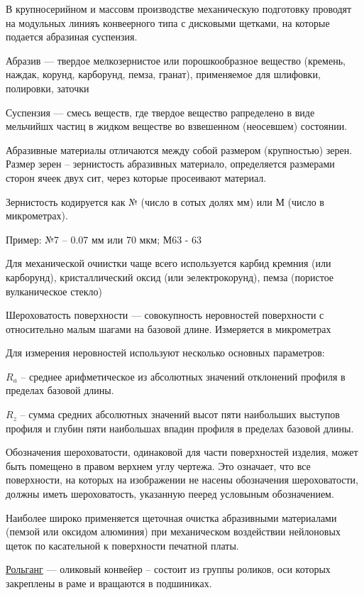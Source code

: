 \documentclass{article}
\begin{document}
В крупносерийном и массовм производстве механическую подготовку проводят на модульных линияъ конвеерного типа с дисковыми щетками, на которые подается абразиная суспензия.

Абразив --- твердое мелкозернистое или порошкообразное вещество (кремень, наждак, корунд, карборунд, пемза, гранат), применяемое для шлифовки, полировки, заточки

Суспензия --- смесь веществ, где твердое вещество рапределено в виде мельчийшх частиц в жидком веществе во взвешенном (неосевшем) состоянии.

Абразивные материалы отличаются между собой размером (крупностью) зерен. Размер зерен -- зернистость абразивных материало, определяется размерами сторон ячеек двух сит, через которые просеивают материал.

Зернистость кодируется как № (число в сотых долях мм) или М (число в микрометрах).

Пример: №7 -- 0.07 мм или 70 мкм; М63 - 63

Для механической очиистки чаще всего используется карбид кремния (или карборунд), кристаллический оксид (или эелектрокорунд), пемза (пористое вулканическое стекло)

Шероховатость поверхности --- совокупность неровностей поверхности с относительно малым шагами на базовой длине. Измеряется в микрометрах

Для измерения неровностей используют несколько основных параметров:

$R_a$ -- среднее арифметическое из абсолютных значений отклонений профиля в пределах базовой длины.

$R_z$ -- сумма средних абсолютных значений высот пяти наибольших выступов профиля и глубин пяти наибольшах впадин профиля в пределах базовой длины.

Обозначения шероховатости, одинаковой для части поверхностей изделия, может быть помещено в правом верхнем углу чертежа. Это означает, что все поверхности, на которых на изображении не насены обозначения шероховатости, должны иметь шероховатость, указанную пееред условыным обозначением.

Наиболее широко применяется щеточная очистка абразивными материалами (пемзой или оксидом алюминия) при механическом воздействии нейлоновых щеток по касательной к поверхности печатной платы.

\underline{Рольганг} --- оликовый конвейер -- состоит из группы роликов, оси которых закреплены в раме и вращаются в подшиниках.
\end{document}
